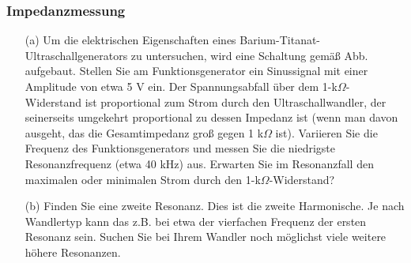 \documentclass[12pt]{scrartcl}
\begin{document}
\subsubsection{Impedanzmessung}
\begin{itemize}
\item[(a)]
Um die elektrischen Eigenschaften eines Barium-Titanat-Ultraschallgenerators zu untersuchen, wird eine Schaltung gemäß Abb. %
aufgebaut. Stellen Sie am Funktionsgenerator ein Sinussignal mit einer Amplitude von etwa 5 V ein.
Der Spannungsabfall über dem 1-k$\Omega$-Widerstand ist proportional zum Strom durch den Ultraschallwandler, der seinerseits umgekehrt proportional zu dessen Impedanz ist (wenn man davon ausgeht, das die Gesamtimpedanz groß gegen 1 k$\Omega$ ist).
Variieren Sie die Frequenz des Funktionsgenerators und messen Sie die niedrigste Resonanzfrequenz (etwa 40 kHz)
aus. Erwarten Sie im Resonanzfall den maximalen oder minimalen Strom durch den 1-k$\Omega$-Widerstand? 
\item[(b)]
Finden Sie eine zweite Resonanz. Dies ist die zweite Harmonische. Je nach Wandlertyp kann das z.B. bei etwa der vierfachen Frequenz der ersten Resonanz sein. Suchen Sie bei Ihrem Wandler noch möglichst viele weitere höhere
Resonanzen.
\end{itemize}
\end{document}

